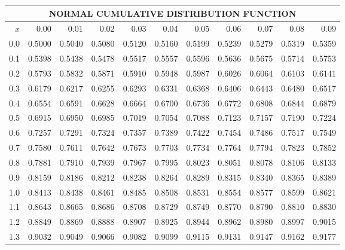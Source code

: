 \documentclass[10pt]{article}
\newenvironment{solution}
    {\par\vspace{0.5em}\begin{mdframed}[linewidth=0.5pt]\par}
    {\end{mdframed}\par\vspace{0.5em}}
\begin{document}

\vspace{1cm}
\begin{center}
    \begin{tabular}{|r|r@{\ }r@{\ }r@{\ }r@{\ }r@{\ }r@{\ }r@{\ }r@{\ }r@{\ }r@{\ }|}
    \hline
    \multicolumn{11}{|c|}{NORMAL CUMULATIVE DISTRIBUTION FUNCTION}\\
    \hline
    \hline
    $x$&0.00&0.01&0.02&0.03&0.04&0.05&0.06&0.07&0.08&0.09\\
    \hline
    0.0&0.5000&0.5040&0.5080&0.5120&0.5160&0.5199&0.5239&0.5279&0.5319&0.5359\\
    \hline
    0.1&0.5398&0.5438&0.5478&0.5517&0.5557&0.5596&0.5636&0.5675&0.5714&0.5753\\
    \hline
    0.2&0.5793&0.5832&0.5871&0.5910&0.5948&0.5987&0.6026&0.6064&0.6103&0.6141\\
    \hline
    0.3&0.6179&0.6217&0.6255&0.6293&0.6331&0.6368&0.6406&0.6443&0.6480&0.6517\\
    \hline
    0.4&0.6554&0.6591&0.6628&0.6664&0.6700&0.6736&0.6772&0.6808&0.6844&0.6879\\
    \hline
    0.5&0.6915&0.6950&0.6985&0.7019&0.7054&0.7088&0.7123&0.7157&0.7190&0.7224\\
    \hline
    0.6&0.7257&0.7291&0.7324&0.7357&0.7389&0.7422&0.7454&0.7486&0.7517&0.7549\\
    \hline
    0.7&0.7580&0.7611&0.7642&0.7673&0.7703&0.7734&0.7764&0.7794&0.7823&0.7852\\
    \hline
    0.8&0.7881&0.7910&0.7939&0.7967&0.7995&0.8023&0.8051&0.8078&0.8106&0.8133\\
    \hline
    0.9&0.8159&0.8186&0.8212&0.8238&0.8264&0.8289&0.8315&0.8340&0.8365&0.8389\\
    \hline
    1.0&0.8413&0.8438&0.8461&0.8485&0.8508&0.8531&0.8554&0.8577&0.8599&0.8621\\
    \hline
    1.1&0.8643&0.8665&0.8686&0.8708&0.8729&0.8749&0.8770&0.8790&0.8810&0.8830\\
    \hline
    1.2&0.8849&0.8869&0.8888&0.8907&0.8925&0.8944&0.8962&0.8980&0.8997&0.9015\\
    \hline
    1.3&0.9032&0.9049&0.9066&0.9082&0.9099&0.9115&0.9131&0.9147&0.9162&0.9177\\

\end{tabular}
\end{center}
\end{document}
